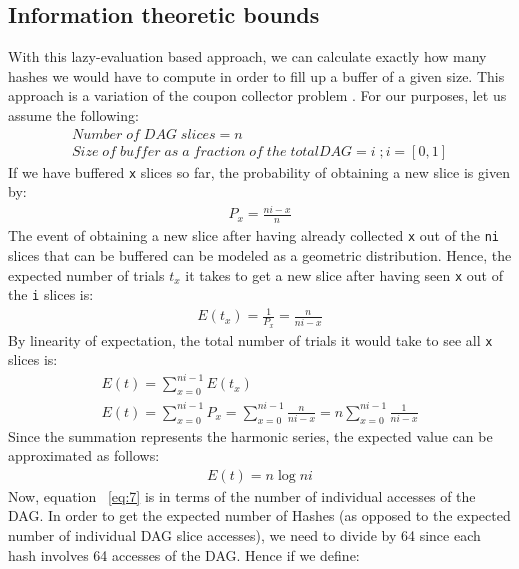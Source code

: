 \documentclass[10pt, conference, compsocconf]{IEEEtran}
\begin{document}

\subsection{Information theoretic bounds}
With this lazy-evaluation based approach, we can calculate exactly how many hashes we would have to compute in order to fill up a buffer of a given size. This approach is a variation of the coupon collector problem \cite{couponCollector}. For our purposes, let us assume the following:
\begin{gather}
    Number\;of\;DAG\;slices = n\\
    Size\;of\;buffer\;as\;a\;fraction\;of\;the\;total DAG = i\;;i=[0,1]
\end{gather}
If we have buffered \verb|x| slices so far, the probability of obtaining a new slice is given by:
\begin{gather}
  P_x = \frac{ni-x}{n}
\end{gather}
The event of obtaining a new slice after having already collected \verb|x| out of the \verb|ni| slices that can be buffered can be modeled as a geometric distribution. Hence, the expected number of trials $t_x$ it takes to get a new  slice after having seen \verb|x| out of the \verb|i| slices is:
\begin{gather}
  E(t_x) = \frac{1}{P_x} = \frac{n}{ni-x}
\end{gather}
By linearity of expectation, the total number of trials it would take to see all \verb|x| slices is:
\begin{gather}
  E(t) = \sum_{x=0}^{ni-1}E(t_x)\\
    E(t) = \sum_{x=0}^{ni-1}P_x = \sum_{x=0}^{ni-1}\frac{n}{ni-x} = n\sum_{x=0}^{ni-1}\frac{1}{ni-x}
\end{gather}
Since the summation represents the harmonic series, the expected value can be approximated as follows:
\begin{gather}
  E(t) = n\log{ni}
\end{gather}
Now, equation ~\ref{eq:7} is in terms of the number of individual accesses of the DAG. In order to get the expected number of Hashes (as opposed to the expected number of individual DAG slice accesses), we need to divide by 64 since each hash involves 64 accesses of the DAG. Hence if we define: 
\end{document}
